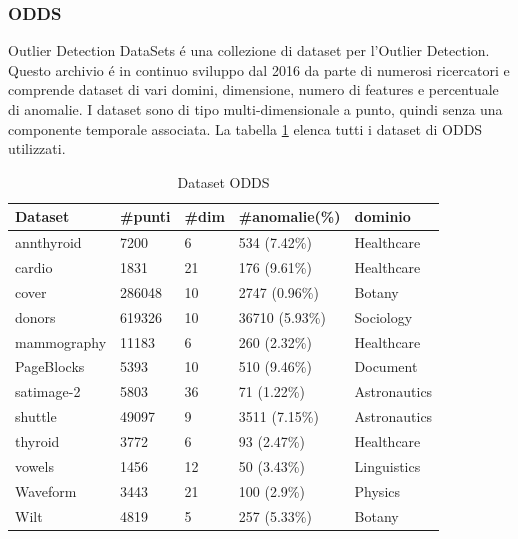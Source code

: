 \subsubsection{ODDS}
Outlier Detection DataSets é una collezione di dataset per l'Outlier Detection. Questo archivio é in continuo sviluppo dal 2016 da parte di numerosi ricercatori e comprende dataset di vari domini, dimensione, numero di features e percentuale di anomalie. 
I dataset sono di tipo multi-dimensionale a punto, quindi senza una componente temporale associata.
La tabella \ref{odds} elenca tutti i dataset di ODDS utilizzati.

\begin{table}
	
	\centering
	\begin{tabular}{|l|l|l|l|l|}
		\hline
		\textbf{Dataset} & \textbf{\#punti} & \textbf{\#dim} & \textbf{\#anomalie(\%)} & \textbf{dominio} \\ \hline
		annthyroid       & 7200              & 6              & 534 (7.42\%)            & Healthcare      \\ \hline
		cardio           & 1831              & 21             & 176 (9.61\%)            & Healthcare      \\ \hline
		cover            & 286048            & 10             & 2747 (0.96\%)           & Botany          \\ \hline
		donors           & 619326            & 10             & 36710 (5.93\%)          & Sociology       \\ \hline
		mammography      & 11183             & 6              & 260 (2.32\%)            & Healthcare      \\ \hline
		PageBlocks       & 5393              & 10             & 510 (9.46\%)            & Document        \\ \hline
		satimage-2       & 5803              & 36             & 71 (1.22\%)             & Astronautics    \\ \hline
		shuttle          & 49097             & 9              & 3511 (7.15\%)           & Astronautics    \\ \hline
		thyroid          & 3772              & 6              & 93 (2.47\%)             & Healthcare      \\ \hline
		vowels           & 1456              & 12             & 50 (3.43\%)             & Linguistics     \\ \hline
		Waveform         & 3443              & 21             & 100 (2.9\%)             & Physics         \\ \hline
		Wilt             & 4819              & 5              & 257 (5.33\%)            & Botany          \\ \hline
	\end{tabular}
	\caption{\label{odds}Dataset ODDS}
\end{table}

